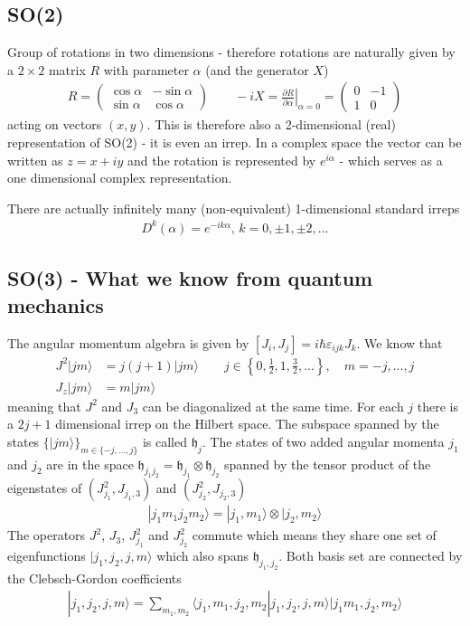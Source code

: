 \documentclass[10pt,a4paper]{article}
\theoremstyle{definition}
\begin{document}
\subsection{SO(2)}
Group of rotations in two dimensions - therefore rotations are naturally given by a $2\times2$ matrix $R$ with parameter $\alpha$ (and the generator $X$)
\begin{align}
R=\left(\begin{matrix}
\cos\alpha  & -\sin\alpha\\
\sin\alpha & \cos\alpha
\end{matrix}\right)
\qquad
-iX=\left.\frac{\partial R}{\partial\alpha}\right|_{\alpha=0}=\left(\begin{matrix}
0 & -1\\
1 & 0
\end{matrix}\right)
\end{align}
acting on vectors $(x,y)$. This is therefore also a 2-dimensional (real) representation of SO(2) - it is even an irrep.
In a complex space the vector can be written as $z=x+iy$ and the rotation is represented by $e^{i\alpha}$ - which serves as a one dimensional complex representation.

There are actually infinitely many (non-equivalent) 1-dimensional standard irreps
\begin{align}
    D^{k}(\alpha)=e^{-ik\alpha},\,k=0,\pm1,\pm2,...
\end{align}

\subsection{SO(3) - What we know from quantum mechanics}
The angular momentum algebra is given by $[J_i,J_j]=i\hbar\varepsilon_{ijk}J_k$. We know that
\begin{align}
J^2|jm\rangle&=j(j+1)|jm\rangle\qquad j\in\left\{0,\frac{1}{2},1,\frac{3}{2},...\right\},\quad m=-j,...,j\\
J_z|jm\rangle&=m|jm\rangle
\end{align}
meaning that $J^2$ and $J_3$ can be diagonalized at the same time. For each $j$ there is a $2j+1$ dimensional 
irrep on the Hilbert space. The subspace spanned by the states $\{|jm\rangle\}_{m\in\{-j,...,j\}}$ 
is called $\mathfrak{h}_j$. The states of 
two added angular momenta $j_1$ and $j_2$ are in the space $\mathfrak{h}_{j_1j_2}=\mathfrak{h}_{j_1}\otimes\mathfrak{h}_{j_2}$ spanned by the tensor product of the eigenstates of $(J_{j_1}^2,J_{j_1,3})$ and $(J_{j_2}^2,J_{j_2,3})$
\begin{align}
|j_1m_1j_2m_2\rangle=|j_1,m_1\rangle\otimes|j_2,m_2\rangle
\end{align}
The operators $J^2$, $J_3$, $J_{j_1}^2$ and $J_{j_2}^2$ commute which means they share one set of eigenfunctions $|j_1,j_2,j,m\rangle$ which also spans $\mathfrak{h}_{j_1,j_2}$. Both basis set are connected by the Clebsch-Gordon coefficients
\begin{align}
|j_1,j_2,j,m\rangle=\sum_{m_1,m_2}\langle j_1,m_1,j_2,m_2|j_1,j_2,j,m\rangle|j_1m_1,j_2,m_2\rangle
\end{align}
\end{document}
